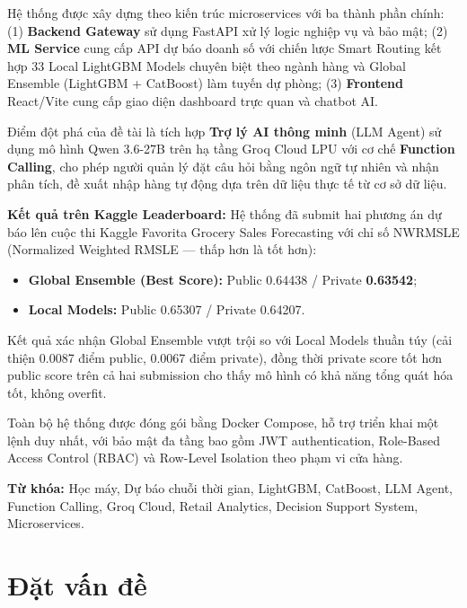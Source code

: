 \documentclass[12pt,a4paper]{report}
\begin{document}
Hệ thống được xây dựng theo kiến trúc microservices với ba thành phần chính: (1) \textbf{Backend Gateway} sử dụng FastAPI xử lý logic nghiệp vụ và bảo mật; (2) \textbf{ML Service} cung cấp API dự báo doanh số với chiến lược Smart Routing kết hợp 33 Local LightGBM Models chuyên biệt theo ngành hàng và Global Ensemble (LightGBM + CatBoost) làm tuyến dự phòng; (3) \textbf{Frontend} React/Vite cung cấp giao diện dashboard trực quan và chatbot AI.

Điểm đột phá của đề tài là tích hợp \textbf{Trợ lý AI thông minh} (LLM Agent) sử dụng mô hình Qwen 3.6-27B trên hạ tầng Groq Cloud LPU với cơ chế \textbf{Function Calling}, cho phép người quản lý đặt câu hỏi bằng ngôn ngữ tự nhiên và nhận phân tích, đề xuất nhập hàng tự động dựa trên dữ liệu thực tế từ cơ sở dữ liệu.

\textbf{Kết quả trên Kaggle Leaderboard:} Hệ thống đã submit hai phương án dự báo lên cuộc thi Kaggle Favorita Grocery Sales Forecasting với chỉ số NWRMSLE (Normalized Weighted RMSLE --- thấp hơn là tốt hơn):

\begin{itemize}
    \item \textbf{Global Ensemble (Best Score):} Public 0.64438 / Private \textbf{0.63542};
    \item \textbf{Local Models:} Public 0.65307 / Private 0.64207.
\end{itemize}

Kết quả xác nhận Global Ensemble vượt trội so với Local Models thuần túy (cải thiện 0.0087 điểm public, 0.0067 điểm private), đồng thời private score tốt hơn public score trên cả hai submission cho thấy mô hình có khả năng tổng quát hóa tốt, không overfit.

Toàn bộ hệ thống được đóng gói bằng Docker Compose, hỗ trợ triển khai một lệnh duy nhất, với bảo mật đa tầng bao gồm JWT authentication, Role-Based Access Control (RBAC) và Row-Level Isolation theo phạm vi cửa hàng.

\textbf{Từ khóa:} Học máy, Dự báo chuỗi thời gian, LightGBM, CatBoost, LLM Agent, Function Calling, Groq Cloud, Retail Analytics, Decision Support System, Microservices.

\cleardoublepage

\chapter*{Đặt vấn đề}
\end{document}
